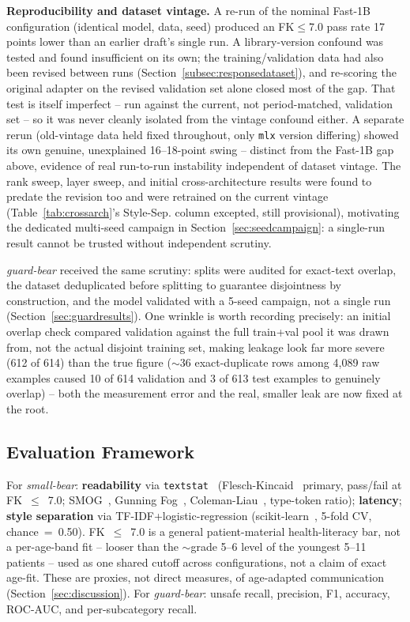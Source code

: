 \documentclass[pdflatex,sn-mathphys-num]{sn-jnl-official}%
\begin{document}
\noindent\textbf{Reproducibility and dataset vintage.}\label{sec:reproducibility} A re-run of the nominal Fast-1B configuration (identical model, data, seed) produced an FK$\leq$7.0 pass rate 17 points lower than an earlier draft's single run. A library-version confound was tested and found insufficient on its own; the training/validation data had also been revised between runs (Section~\ref{subsec:responsedataset}), and re-scoring the original adapter on the revised validation set alone closed most of the gap. That test is itself imperfect -- run against the current, not period-matched, validation set -- so it was never cleanly isolated from the vintage confound either. A separate rerun (old-vintage data held fixed throughout, only \texttt{mlx} version differing) showed its own genuine, unexplained 16--18-point swing -- distinct from the Fast-1B gap above, evidence of real run-to-run instability independent of dataset vintage. The rank sweep, layer sweep, and initial cross-architecture results were found to predate the revision too and were retrained on the current vintage (Table~\ref{tab:crossarch}'s Style-Sep. column excepted, still provisional), motivating the dedicated multi-seed campaign in Section~\ref{sec:seedcampaign}: a single-run result cannot be trusted without independent scrutiny.

\textit{guard-bear} received the same scrutiny: splits were audited for exact-text overlap, the dataset deduplicated before splitting to guarantee disjointness by construction, and the model validated with a 5-seed campaign, not a single run (Section~\ref{sec:guardresults}). One wrinkle is worth recording precisely: an initial overlap check compared validation against the full train+val pool it was drawn from, not the actual disjoint training set, making leakage look far more severe (612 of 614) than the true figure ($\sim$36 exact-duplicate rows among 4{,}089 raw examples caused 10 of 614 validation and 3 of 613 test examples to genuinely overlap) -- both the measurement error and the real, smaller leak are now fixed at the root.

\subsection{Evaluation Framework}

For \textit{small-bear}: \textbf{readability} via \texttt{textstat}~\cite{bansal2023textstat} (Flesch-Kincaid~\cite{kincaid1975fk} primary, pass/fail at FK~$\leq$~7.0; SMOG~\cite{mclaughlin1969smog}, Gunning Fog~\cite{gunning1952fog}, Coleman-Liau~\cite{coleman1975cli}, type-token ratio); \textbf{latency}; \textbf{style separation} via TF-IDF+logistic-regression (scikit-learn~\cite{pedregosa2011sklearn}, 5-fold CV, chance~=~0.50). FK~$\leq$~7.0 is a general patient-material health-literacy bar, not a per-age-band fit -- looser than the $\sim$grade 5--6 level of the youngest 5--11 patients -- used as one shared cutoff across configurations, not a claim of exact age-fit. These are proxies, not direct measures, of age-adapted communication (Section~\ref{sec:discussion}). For \textit{guard-bear}: unsafe recall, precision, F1, accuracy, ROC-AUC, and per-subcategory recall.
\end{document}
